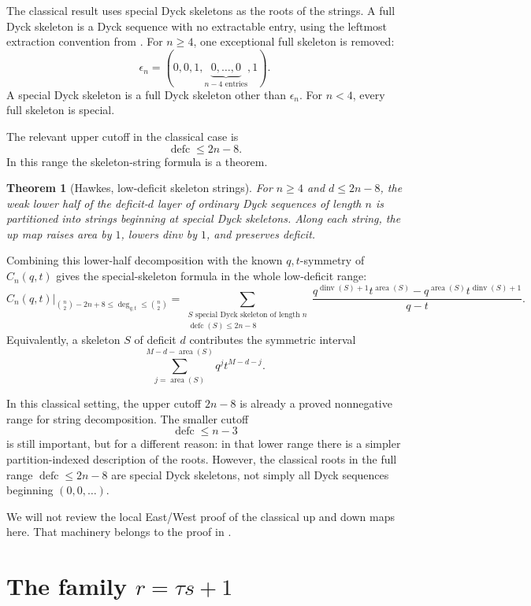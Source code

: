 \documentclass[11pt]{article}
\newcommand{\area}{\operatorname{area}}
\newcommand{\dinv}{\operatorname{dinv}}
\newcommand{\defc}{\operatorname{defc}}
\newtheorem{theorem}{Theorem}
\begin{document}
The classical result uses special Dyck skeletons as the roots of the strings.
A full Dyck skeleton is a Dyck sequence with no extractable entry, using the
leftmost extraction convention from \cite{Hawkes2026}.  For \(n\ge4\), one
exceptional full skeleton is removed:
\[
  \epsilon_n=(0,0,1,\underbrace{0,\ldots,0}_{n-4\text{ entries}},1).
\]
A special Dyck skeleton is a full Dyck skeleton other than \(\epsilon_n\).  For
\(n<4\), every full skeleton is special.

The relevant upper cutoff in the classical case is
\[
  \defc \le 2n-8.
\]
In this range the skeleton-string formula is a theorem.

\begin{theorem}[Hawkes, low-deficit skeleton strings]
For \(n\ge4\) and \(d\le 2n-8\), the weak lower half of the deficit-\(d\)
layer of ordinary Dyck sequences of length \(n\) is partitioned into strings
beginning at special Dyck skeletons.  Along each string, the up map raises area
by \(1\), lowers dinv by \(1\), and preserves deficit.
\end{theorem}

Combining this lower-half decomposition with the known \(q,t\)-symmetry of
\(C_n(q,t)\) gives the special-skeleton formula in the whole low-deficit range:
\[
\left.C_n(q,t)\right|_{\binom n2-2n+8\le \deg_{q,t}\le \binom n2}
=
\sum_{\substack{S\text{ special Dyck skeleton of length }n\\
                \defc(S)\le 2n-8}}
\frac{
q^{\dinv(S)+1}t^{\area(S)}
-
q^{\area(S)}t^{\dinv(S)+1}
}{q-t}.
\]
Equivalently, a skeleton \(S\) of deficit \(d\) contributes the symmetric
interval
\[
  \sum_{j=\area(S)}^{M-d-\area(S)}
  q^j t^{M-d-j}.
\]

In this classical setting, the upper cutoff \(2n-8\) is already a proved
nonnegative range for string decomposition.  The smaller cutoff
\[
  \defc \le n-3
\]
is still important, but for a different reason: in that lower range there is a
simpler partition-indexed description of the roots.  However, the classical
roots in the full range \(\defc\le 2n-8\) are special Dyck skeletons, not simply
all Dyck sequences beginning \((0,0,\ldots)\).

We will not review the local East/West proof of the classical up and down maps
here.  That machinery belongs to the proof in \cite{Hawkes2026}.

\section{The family \(r=\tau s+1\)}
\end{document}
